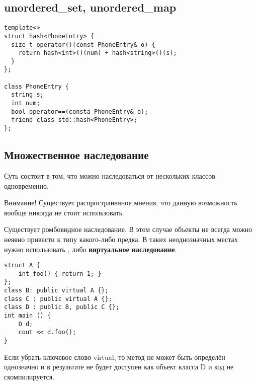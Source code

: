 \subsection{unordered\_set, unordered\_map}

\begin{verbatim}
template<>
struct hash<PhoneEntry> {
  size_t operator()(const PhoneEntry& o) {
    return hash<int>()(num) + hash<string>()(s);
  }
};

class PhoneEntry {
  string s;
  int num;
  bool operator==(consta PhoneEntry& o);
  friend class std::hash<PhoneEntry>;
};
\end{verbatim}

\subsection{Множественное наследование}

Суть состоит в том, что можно наследоваться от нескольких классов одновременно. 

Внимание! Существует распространенное мнения, что данную возможность вообще никогда не стоит использовать.

Существует ромбовидное наследование. В этом случае объекты не всегда можно неявно привести к типу какого-либо предка. В таких неоднозначных местах нужно использовать , либо \textbf{виртуальное наследование}.

\begin{verbatim}
struct A {
    int foo() { return 1; }
};
class B: public virtual A {};
class C : public virtual A {};
class D : public B, public C {};
int main () {
    D d;
    cout << d.foo();
}
\end{verbatim}

Если убрать ключевое слово virtual, то метод  не может быть определён однозначно и в результате не будет доступен как объект класса D и код не скомпилируется.
